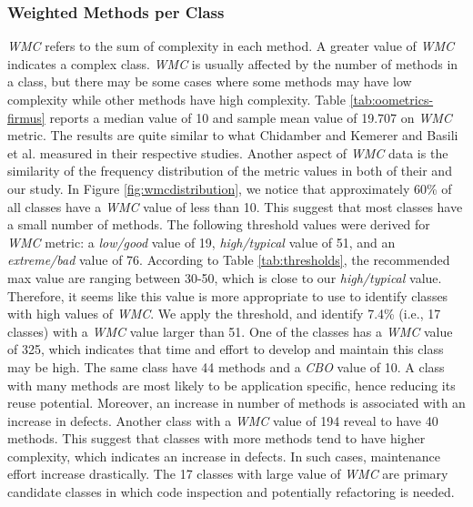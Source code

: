 \subsubsection{Weighted Methods per Class}
\textit{WMC} refers to the sum of complexity in each method. A greater value of \textit{WMC} indicates a complex class. \textit{WMC} is usually affected by the number of methods in a class, but there may be some cases where some methods may have low complexity while other methods have high complexity. Table \ref{tab:oometrics-firmus} reports a median value of 10 and sample mean value of 19.707 on \textit{WMC} metric. The results are quite similar to what Chidamber and Kemerer\cite{chidamber1994metrics} and Basili et al.\cite{basili1996validation} measured in their respective studies. Another aspect of \textit{WMC} data is the similarity of the frequency distribution of the metric values in both of their and our study. In Figure \ref{fig:wmcdistribution}, we notice that approximately 60\% of all classes have a \textit{WMC} value of less than 10. This suggest that most classes have a small number of methods. The following threshold values were derived for \textit{WMC} metric: a \textit{low/good} value of 19, \textit{high/typical} value of 51, and an \textit{extreme/bad} value of 76. According to Table \ref{tab:thresholds}, the recommended max value are ranging between 30-50, which is close to our \textit{high/typical} value. Therefore, it seems like this value is more appropriate to use to identify classes with high values of \textit{WMC}. We apply the threshold, and identify 7.4\% (i.e., 17 classes) with a \textit{WMC} value larger than 51. One of the classes has a \textit{WMC} value of 325, which indicates that time and effort to develop and maintain this class may be high. The same class have 44 methods and a \textit{CBO} value of 10. A class with many methods are most likely to be application specific, hence reducing its reuse potential. Moreover, an increase in number of methods is associated with an increase in defects\cite{subramanyam2003empirical}. Another class with a \textit{WMC} value of 194 reveal to have 40 methods. This suggest that classes with more methods tend to have higher complexity, which indicates an increase in defects. In such cases, maintenance effort increase drastically. The 17 classes with large value of \textit{WMC} are primary candidate classes in which code inspection and potentially refactoring is needed.





